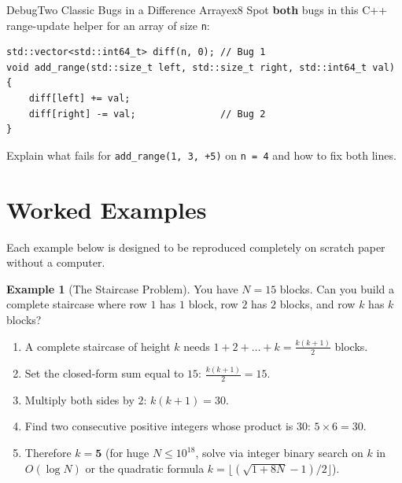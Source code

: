 \documentclass[11pt,a4paper]{article}
\theoremstyle{definition}
\newtheorem{example}{Example}[section]
\begin{document}
\begin{tryitbox}{Debug}{Two Classic Bugs in a Difference Array}{ex8}
Spot \textbf{both} bugs in this C++ range-update helper for an array of size \texttt{n}:
\begin{lstlisting}[numbers=none, xleftmargin=4pt, framexleftmargin=4pt]
std::vector<std::int64_t> diff(n, 0); // Bug 1
void add_range(std::size_t left, std::size_t right, std::int64_t val) {
    diff[left] += val;
    diff[right] -= val;               // Bug 2
}
\end{lstlisting}
Explain what fails for \texttt{add\_range(1, 3, +5)} on \texttt{n = 4} and how to fix both lines.
\end{tryitbox}

\section{Worked Examples}

Each example below is designed to be reproduced completely on scratch paper without a computer.

\begin{example}[The Staircase Problem]
You have $N = 15$ blocks. Can you build a complete staircase where row $1$ has $1$ block, row $2$ has $2$ blocks, and row $k$ has $k$ blocks?
\begin{enumerate}
    \item A complete staircase of height $k$ needs $1 + 2 + \dots + k = \frac{k(k + 1)}{2}$ blocks.
    \item Set the closed-form sum equal to $15$: $\frac{k(k + 1)}{2} = 15$.
    \item Multiply both sides by $2$: $k(k + 1) = 30$.
    \item Find two consecutive positive integers whose product is $30$: $5 \times 6 = 30$.
    \item Therefore $k = \mathbf{5}$ (for huge $N \le 10^{18}$, solve via integer binary search on $k$ in $O(\log N)$ or the quadratic formula $k = \lfloor(\sqrt{1 + 8N} - 1)/2\rfloor$).
\end{enumerate}
\end{example}
\end{document}
